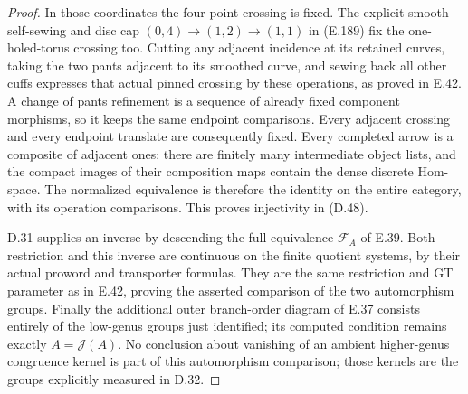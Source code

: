 \begin{proof}
In those coordinates the four-point
crossing is fixed.  The explicit smooth
self-sewing and disc cap
$(0,4)\to(1,2)\to(1,1)$ in (E.189)
fix the one-holed-torus crossing too.
Cutting any adjacent incidence at its
retained curves, taking the two pants
adjacent to its smoothed curve, and
sewing back all other cuffs expresses
that actual pinned crossing by these
operations, as proved in E.42.  A
change of pants refinement is a sequence
of already fixed component morphisms,
so it keeps the same endpoint comparisons.
Every adjacent crossing and every
endpoint translate are consequently fixed.
Every completed arrow is a composite
of adjacent ones: there are finitely
many intermediate object lists, and
the compact images of their composition
maps contain the dense discrete Hom-space.
The normalized equivalence is therefore
the identity on the entire category,
with its operation comparisons.  This
proves injectivity in (D.48).

D.31 supplies an inverse by descending
the full equivalence $\mathcal F_A$ of
E.39.  Both restriction and this inverse
are continuous on the finite quotient
systems, by their actual proword and
transporter formulas.  They are the
same restriction and GT parameter as
in E.42, proving the asserted comparison
of the two automorphism groups.  Finally
the additional outer branch-order
diagram of E.37 consists entirely of
the low-genus groups just identified;
its computed condition remains exactly
$A=\mathcal J(A)$.  No conclusion about
vanishing of an ambient higher-genus
congruence kernel is part of this
automorphism comparison; those kernels
are the groups explicitly measured in
D.32.
\end{proof}
